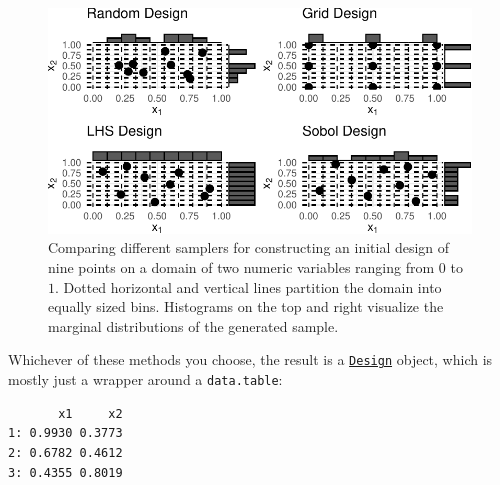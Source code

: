\begin{figure}

{\centering \includegraphics[width=1\textwidth,height=\textheight]{chapters/chapter5/advanced_tuning_methods_and_black_box_optimization_files/figure-pdf/fig-bayesian-optimization-designs-1.pdf}

}

\caption{\label{fig-bayesian-optimization-designs}Comparing different
samplers for constructing an initial design of nine points on a domain
of two numeric variables ranging from \(0\) to \(1\). Dotted horizontal
and vertical lines partition the domain into equally sized bins.
Histograms on the top and right visualize the marginal distributions of
the generated sample.}

\end{figure}

Whichever of these methods you choose, the result is a
\href{https://paradox.mlr-org.com/reference/Design.html}{\texttt{Design}}
object, which is mostly just a wrapper around a \texttt{data.table}:

\begin{Shaded}
\begin{Highlighting}[]
\OtherTok{=} \NormalTok{(} \NormalTok{(}\NormalTok{, }\NormalTok{), } \NormalTok{(}\NormalTok{, }\NormalTok{))}
 \NormalTok{)}\SpecialCharTok{$}
\end{Highlighting}
\end{Shaded}

\begin{verbatim}
       x1     x2
1: 0.9930 0.3773
2: 0.6782 0.4612
3: 0.4355 0.8019
\end{verbatim}

